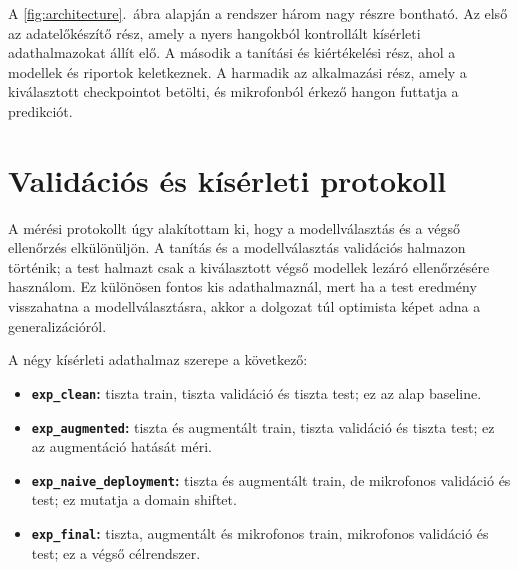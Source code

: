 A \ref{fig:architecture}.~ábra alapján a rendszer három nagy részre bontható. Az első az adatelőkészítő rész, amely a nyers hangokból kontrollált kísérleti adathalmazokat állít elő. A második a tanítási és kiértékelési rész, ahol a modellek és riportok keletkeznek. A harmadik az alkalmazási rész, amely a kiválasztott checkpointot betölti, és mikrofonból érkező hangon futtatja a predikciót.

\section{Validációs és kísérleti protokoll}
\label{sec:adatszivargas_gyakorlat}

A mérési protokollt úgy alakítottam ki, hogy a modellválasztás és a végső ellenőrzés elkülönüljön. A tanítás és a modellválasztás validációs halmazon történik; a test halmazt csak a kiválasztott végső modellek lezáró ellenőrzésére használom. Ez különösen fontos kis adathalmaznál, mert ha a test eredmény visszahatna a modellválasztásra, akkor a dolgozat túl optimista képet adna a generalizációról.

A négy kísérleti adathalmaz szerepe a következő:
\begin{itemize}
  \item \textbf{\texttt{exp\_clean}:} tiszta train, tiszta validáció és tiszta test; ez az alap baseline.
  \item \textbf{\texttt{exp\_augmented}:} tiszta és augmentált train, tiszta validáció és tiszta test; ez az augmentáció hatását méri.
  \item \textbf{\texttt{exp\_naive\_deployment}:} tiszta és augmentált train, de mikrofonos validáció és test; ez mutatja a domain shiftet.
  \item \textbf{\texttt{exp\_final}:} tiszta, augmentált és mikrofonos train, mikrofonos validáció és test; ez a végső célrendszer.
\end{itemize}

